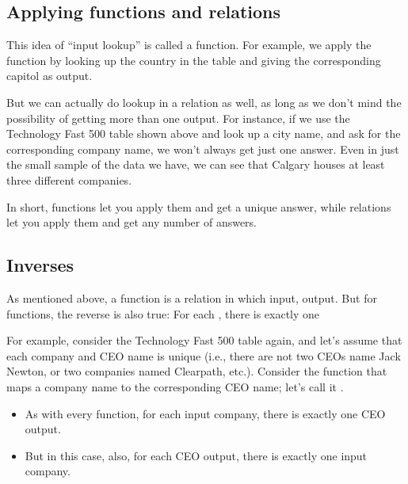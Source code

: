 \documentclass[letterpaper,10pt,english]{sphinxmanual}
\begin{document}
\subsection{Applying functions and relations}
\label{\detokenize{chapter-2-mathematical-foundations:applying-functions-and-relations}}
This idea of “input lookup” is called  a function.  For example, we apply the  function by looking up the country in the table and giving the corresponding capitol as output.

But we can actually do lookup in a relation as well, as long as we don’t mind the possibility of getting more than one output.  For instance, if we use the Technology Fast 500 table shown above and look up a city name, and ask for the corresponding company name, we won’t always get just one answer.  Even in just the small sample of the data we have, we can see that Calgary houses at least three different companies.

In short, functions let you apply them and get a unique answer, while relations let you apply them and get any number of answers.


\subsection{Inverses}
\label{\detokenize{chapter-2-mathematical-foundations:inverses}}
As mentioned above, a function is a relation in which  input,  output.  But for  functions, the reverse is also true:  For each , there is exactly one 

For example, consider the Technology Fast 500 table again, and let’s assume that each company and CEO name is unique (i.e., there are not two CEOs name Jack Newton, or two companies named Clearpath, etc.).  Consider the function that maps a company name to the corresponding CEO name; let’s call it .
\begin{itemize}
\item {} 
As with every function, for each input company, there is exactly one CEO output.

\item {} 
But in this case, also, for each CEO output, there is exactly one input company.

\end{itemize}
\end{document}
